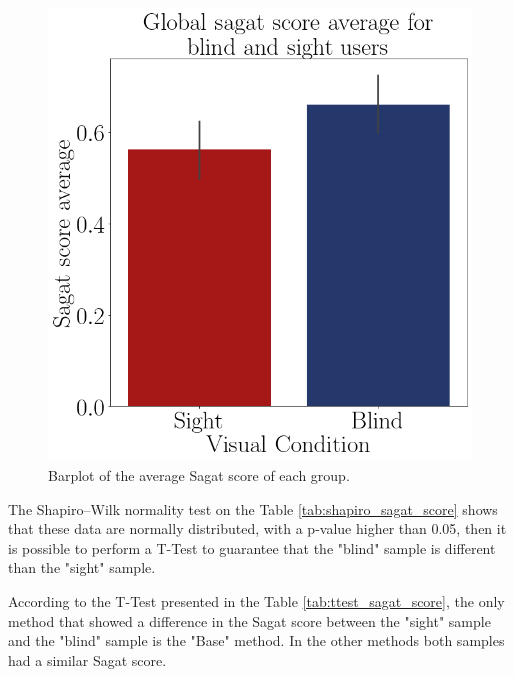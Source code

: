 \begin{figure}[!htb]
\begin{minipage}{.45\linewidth}
        \vspace{1.8cm}
        \centering
        \includegraphics[width = \linewidth]{Resultados/Sagat/Figuras/png/barplot_sagat_avg_global.png}
        \caption{Barplot of the average Sagat score of each group.}
        \label{fig:barplot_sagat}
    \end{minipage}
\end{figure}

The Shapiro–Wilk normality test on the Table \ref{tab:shapiro_sagat_score} shows that these data are normally distributed, with a p-value higher than 0.05, then it is possible to perform a T-Test to guarantee that the "blind" sample is different than the "sight" sample.

According to the T-Test presented in the Table \ref{tab:ttest_sagat_score}, the only method that showed a difference in the Sagat score between the "sight" sample and the "blind" sample is the "Base" method. In the other methods both samples had a similar Sagat score.

\begin{table}[!htb]
    \begin{minipage}{.45\linewidth}
        
    \end{minipage}
    \hfill
    \begin{minipage}{.45\linewidth}
        \vspace{-2.75cm}
        
    \end{minipage}
\end{table}

